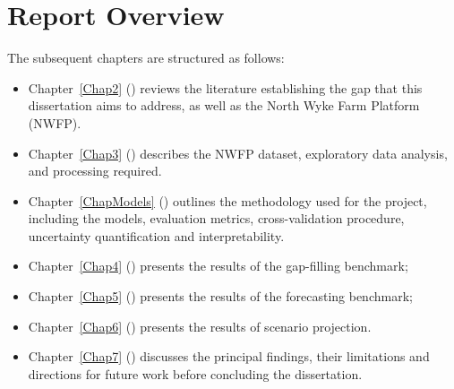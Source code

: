 \section{Report Overview}
The subsequent chapters are structured as follows:
\begin{itemize}
    \item Chapter~\ref{Chap2} () reviews the literature establishing the gap that this dissertation 
    aims to address, as well as the North Wyke Farm Platform (NWFP).
    \item Chapter~\ref{Chap3} () describes the NWFP dataset, exploratory data analysis, and
    processing required.
    \item Chapter~\ref{ChapModels} () outlines the methodology used for the project, including the 
    models, evaluation metrics, cross-validation procedure, uncertainty quantification and 
    interpretability.
    \item Chapter~\ref{Chap4} () presents the results of the gap-filling benchmark; 
    \item Chapter~\ref{Chap5} () presents the results of the forecasting benchmark; 
    \item Chapter~\ref{Chap6} () presents the results of scenario projection.
    \item Chapter~\ref{Chap7} () discusses the principal findings, their limitations and directions for future work before concluding the dissertation.    
\end{itemize}
